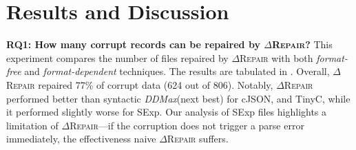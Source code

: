 \documentclass[acmsmall,screen,review,anonymous]{acmart}
\newcommand{\formatfree}{format-free\xspace}
\newcommand{\formatdependent}{format-dependent\xspace}
\newcommand{\dtask}{data repair\xspace}
\newcommand{\approach}{\textsc{$\Delta$Repair}\xspace}
\newcommand{\ddmax}{\textit{DDMax}\xspace}
\newcommand{\drepair}{\approach}
\begin{document}
% 
% 
% 

\section{Results and Discussion}
\label{sec:discussion}
\noindent\textbf{RQ1: How many corrupt records can be repaired by \drepair?}
This experiment compares the number of files repaired by \drepair with both
\emph{\formatfree} and \emph{\formatdependent}
techniques. The results are tabulated in .
Overall, \drepair repaired 77\% of corrupt data (624 out of 806).
Notably, \drepair performed better than syntactic \ddmax (next best)
for cJSON, and TinyC, while it performed slightly worse for SExp.
Our analysis of SExp files
highlights a limitation of \drepair---if the corruption does not trigger a parse
error immediately, the effectiveness naive \drepair suffers.
\end{document}
